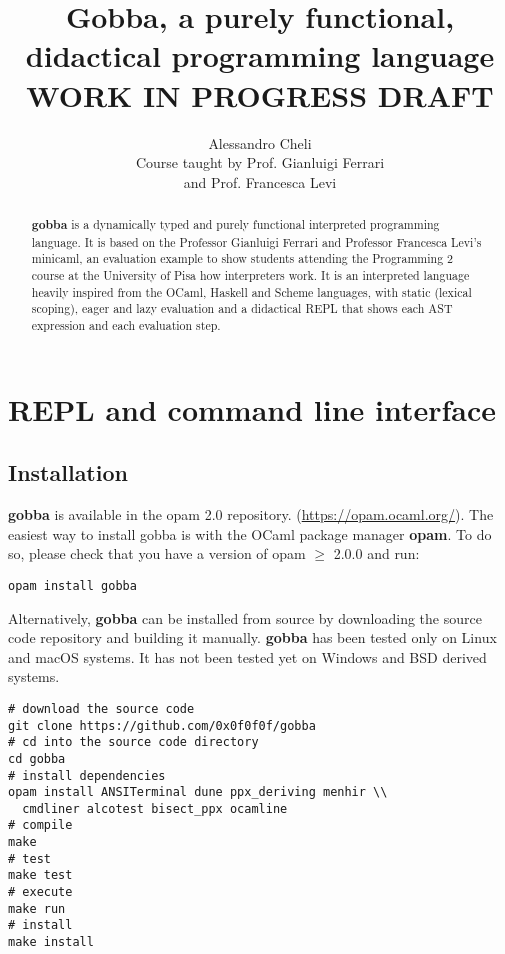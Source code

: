 \documentclass[a4paper, 10pt]{article}
\title{Gobba, a purely functional, didactical programming language\\WORK IN PROGRESS DRAFT}
\author{Alessandro Cheli\\Course taught by Prof. Gianluigi Ferrari\\and Prof. Francesca Levi}
\theoremstyle{plain}%
\theoremstyle{definition}
\theoremstyle{remark}
\begin{document}
\maketitle

\begin{abstract}
\textbf{gobba} is a dynamically typed and purely functional interpreted
programming language. It is based on the Professor Gianluigi Ferrari and
Professor Francesca Levi's minicaml, an evaluation example to show students
attending the Programming 2 course at the University of Pisa how interpreters
work. It is an interpreted language heavily inspired from the OCaml, Haskell and
Scheme languages, with static (lexical scoping), eager and lazy evaluation and a
didactical REPL that shows each AST expression and each evaluation step.
\end{abstract}

\section{REPL and command line interface}
\subsection{Installation}
\textbf{gobba} is available in the opam 2.0 repository.
(\url{https://opam.ocaml.org/}). The easiest way to install gobba is with the
OCaml package manager \textbf{opam}. To do so, please check that you have a version of opam $\geq$
2.0.0 and run:
\begin{lstlisting}[style=bash]
opam install gobba
\end{lstlisting}
Alternatively, \textbf{gobba} can be installed from source by downloading the
source code repository and building it manually. \textbf{gobba} has been tested
only on Linux and macOS systems. It has not been tested yet on Windows and BSD
derived systems.
\begin{lstlisting}[style=bash]
# download the source code
git clone https://github.com/0x0f0f0f/gobba
# cd into the source code directory
cd gobba
# install dependencies
opam install ANSITerminal dune ppx_deriving menhir \\
  cmdliner alcotest bisect_ppx ocamline
# compile
make
# test
make test
# execute
make run
# install
make install
\end{lstlisting}

\clearpage
\end{document}
